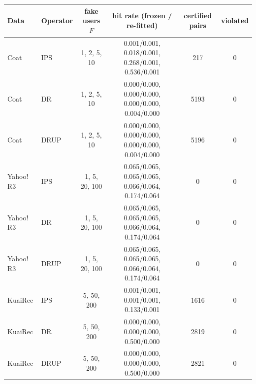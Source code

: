 \begin{tabular}{llcccc}
\toprule
Data & Operator & fake users $F$ & hit rate (frozen / re-fitted) & certified pairs & violated\\
\midrule
Coat & IPS & 1, 2, 5, 10 & 0.001/0.001, 0.018/0.001, 0.268/0.001, 0.536/0.001 & 217 & 0\\
Coat & DR & 1, 2, 5, 10 & 0.000/0.000, 0.000/0.000, 0.000/0.000, 0.004/0.000 & 5193 & 0\\
Coat & DRUP & 1, 2, 5, 10 & 0.000/0.000, 0.000/0.000, 0.000/0.000, 0.004/0.000 & 5196 & 0\\
Yahoo!\,R3 & IPS & 1, 5, 20, 100 & 0.065/0.065, 0.065/0.065, 0.066/0.064, 0.174/0.064 & 0 & 0\\
Yahoo!\,R3 & DR & 1, 5, 20, 100 & 0.065/0.065, 0.065/0.065, 0.066/0.064, 0.174/0.064 & 0 & 0\\
Yahoo!\,R3 & DRUP & 1, 5, 20, 100 & 0.065/0.065, 0.065/0.065, 0.066/0.064, 0.174/0.064 & 0 & 0\\
KuaiRec & IPS & 5, 50, 200 & 0.001/0.001, 0.001/0.001, 0.133/0.001 & 1616 & 0\\
KuaiRec & DR & 5, 50, 200 & 0.000/0.000, 0.000/0.000, 0.500/0.000 & 2819 & 0\\
KuaiRec & DRUP & 5, 50, 200 & 0.000/0.000, 0.000/0.000, 0.500/0.000 & 2821 & 0\\
\bottomrule
\end{tabular}
